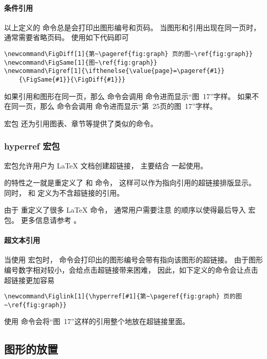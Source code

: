\paragraph{条件引用}
以上定义的  命令总是会打印出图形编号和页码。
当图形和引用出现在同一页时，通常需要省略页码。
使用如下代码即可
\begin{lstlisting}
\newcommand\FigDiff[1]{第~\pageref{fig:graph} 页的图~\ref{fig:graph}}
\newcommand\FigSame[1]{图~\ref{fig:graph}}
\newcommand\Figref[1]{\ifthenelse{\value{page}=\pageref{#1}}
	{\FigSame{#1}}{\FigDiff{#1}}}
\end{lstlisting}
如果引用和图形在同一页，那么  命令会调用  命令进而显示“图~17”字样。
如果不在同一页，那么  命令会调用  命令进而显示“第~25页的图~17”字样。

宏包  \cite{varioref-doc} 还为引用图表、章节等提供了类似的命令。

\subsubsection{hyperref 宏包}\label{sssec:hyperref}

 宏包允许用户为 \LaTeX{} 文档创建超链接，
主要结合  一起使用。

 的特性之一就是重定义了  和  命令，
这样可以作为指向引用的超链接排版显示。
同时， 和  定义为不含超链接的引用。

由于  重定义了很多 \LaTeX{} 命令，
通常用户需要注意  的顺序以使得最后导入  宏包。
更多信息请参考 \cite{hyperref-manual}。

\paragraph{超文本引用}
当使用  宏包时， 命令会打印出的图形编号会带有指向该图形的超链接。
由于图形编号数字相对较小，会给点击超链接带来困难，
因此，如下定义的命令会让点击超链接更加容易
\begin{lstlisting}
\newcommand\Figlink[1]{\hyperref[#1]{第~\pageref{fig:graph} 页的图~\ref{fig:graph}}
\end{lstlisting}
使用  命令会将“图~17”这样的引用整个地放在超链接里面。


\subsection{图形的放置}\label{ssec:figplacement}

